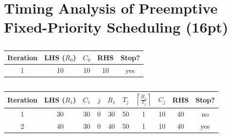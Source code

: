 \documentclass{article}
\begin{document}
\subsection{}
\inputminted[frame=lines,framesep=2mm,baselinestretch=1.2,linenos,breaklines]{cpp}{calcWorstRes.cpp}

\section{Timing Analysis of Preemptive Fixed-Priority Scheduling (16pt)}
\subsection{}
\begin{table}[h]
    \centering
    \begin{tabular}{|c||c||c|c|c|}
        \hline
        Iteration & LHS ($R_0$) & $C_0$ & RHS & Stop? \\
        \hline \hline
        1 & 10 & 10 & 10 & yes \\
        \hline
    \end{tabular}
\end{table}

\subsection{}
\begin{table}[h]
    \centering
    \renewcommand{\arraystretch}{1.3}
    \begin{tabular}{|c||c||c|c|c|c|c|c|c|c|}
        \hline
        Iteration & LHS ($R_1$) & $C_1$ & $j$ & $R_1$ & $T_j$ & $\left\lceil \frac{R_1}{T_j} \right\rceil$ & $C_j$ & RHS & Stop? \\
        \hline \hline
        1 & 30  & 30 & 0 & 30 & 50 & 1 & 10 & 40 & no \\
        \hline
        2 & 40 & 30 & 0 & 40 & 50 & 1 & 10 & 40 & yes \\
        \hline
    \end{tabular}
\end{table}
\end{document}
